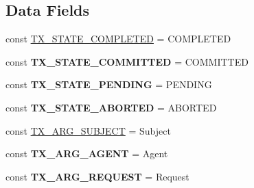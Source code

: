 \subsection*{Data Fields}
\begin{DoxyCompactItemize}
\item 
const \hyperlink{interface_able_polecat___transaction_interface_abcfd87c8ccec5768bde1a9c8452d9c7f}{T\+X\+\_\+\+S\+T\+A\+T\+E\+\_\+\+C\+O\+M\+P\+L\+E\+T\+E\+D} = \textquotesingle{}C\+O\+M\+P\+L\+E\+T\+E\+D\textquotesingle{}
\item 
\hypertarget{interface_able_polecat___transaction_interface_aca2244692649f9180894defc66a5e3b2}{}const {\bfseries T\+X\+\_\+\+S\+T\+A\+T\+E\+\_\+\+C\+O\+M\+M\+I\+T\+T\+E\+D} = \textquotesingle{}C\+O\+M\+M\+I\+T\+T\+E\+D\textquotesingle{}\label{interface_able_polecat___transaction_interface_aca2244692649f9180894defc66a5e3b2}

\item 
\hypertarget{interface_able_polecat___transaction_interface_a2c72fc1bd7fab2d31e6622f1f3f9f025}{}const {\bfseries T\+X\+\_\+\+S\+T\+A\+T\+E\+\_\+\+P\+E\+N\+D\+I\+N\+G} = \textquotesingle{}P\+E\+N\+D\+I\+N\+G\textquotesingle{}\label{interface_able_polecat___transaction_interface_a2c72fc1bd7fab2d31e6622f1f3f9f025}

\item 
\hypertarget{interface_able_polecat___transaction_interface_a7ec530c142b0dd6ccf71745d8c973f7f}{}const {\bfseries T\+X\+\_\+\+S\+T\+A\+T\+E\+\_\+\+A\+B\+O\+R\+T\+E\+D} = \textquotesingle{}A\+B\+O\+R\+T\+E\+D\textquotesingle{}\label{interface_able_polecat___transaction_interface_a7ec530c142b0dd6ccf71745d8c973f7f}

\item 
const \hyperlink{interface_able_polecat___transaction_interface_a726c4c2c8870ed3d97a4a758df3486fe}{T\+X\+\_\+\+A\+R\+G\+\_\+\+S\+U\+B\+J\+E\+C\+T} = \textquotesingle{}Subject\textquotesingle{}
\item 
\hypertarget{interface_able_polecat___transaction_interface_a196bbb97fa59a5c67c37d8e349ab8d96}{}const {\bfseries T\+X\+\_\+\+A\+R\+G\+\_\+\+A\+G\+E\+N\+T} = \textquotesingle{}Agent\textquotesingle{}\label{interface_able_polecat___transaction_interface_a196bbb97fa59a5c67c37d8e349ab8d96}

\item 
\hypertarget{interface_able_polecat___transaction_interface_a200d8f7a611c9d158d57272cef3b13e9}{}const {\bfseries T\+X\+\_\+\+A\+R\+G\+\_\+\+R\+E\+Q\+U\+E\+S\+T} = \textquotesingle{}Request\textquotesingle{}\label{interface_able_polecat___transaction_interface_a200d8f7a611c9d158d57272cef3b13e9}


\end{DoxyCompactItemize}
